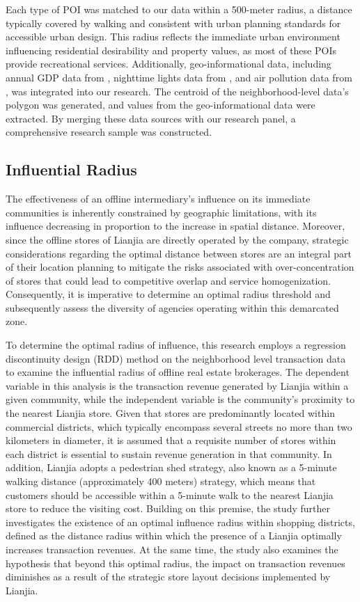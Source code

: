 \documentclass[11pt]{article}
\begin{document}
Each type of POI was matched to our data within a 500-meter radius, a distance typically covered by walking and consistent with urban planning standards for accessible urban design. This radius reflects the immediate urban environment influencing residential desirability and property values, as most of these POIs provide recreational services. Additionally, geo-informational data, including annual GDP data from \citet{zhao_forecasting_2017}, nighttime lights data from \citet{elvidge_annual_2021}, and air pollution data from \citet{doi:10.1021/acs.est.1c05309}, was integrated into our research. The centroid of the neighborhood-level data's polygon was generated, and values from the geo-informational data were extracted. By merging these data sources with our research panel, a comprehensive research sample was constructed.

\subsection{Influential Radius} \label{subsec:Influential_Radius}

The effectiveness of an offline intermediary's influence on its immediate communities is inherently constrained by geographic limitations, with its influence decreasing in proportion to the increase in spatial distance. Moreover, since the offline stores of Lianjia are directly operated by the company, strategic considerations regarding the optimal distance between stores are an integral part of their location planning to mitigate the risks associated with over-concentration of stores that could lead to competitive overlap and service homogenization. Consequently, it is imperative to determine an optimal radius threshold and subsequently assess the diversity of agencies operating within this demarcated zone.

To determine the optimal radius of influence, this research employs a regression discontinuity design (RDD) method on the neighborhood level transaction data to examine the influential radius of offline real estate brokerages. The dependent variable in this analysis is the transaction revenue generated by Lianjia within a given community, while the independent variable is the community's proximity to the nearest Lianjia store. Given that stores are predominantly located within commercial districts, which typically encompass several streets no more than two kilometers in diameter, it is assumed that a requisite number of stores within each district is essential to sustain revenue generation in that community. In addition, Lianjia adopts a pedestrian shed strategy, also known as a 5-minute walking distance (approximately 400 meters) strategy, which means that customers should be accessible within a 5-minute walk to the nearest Lianjia store to reduce the visiting cost. Building on this premise, the study further investigates the existence of an optimal influence radius within shopping districts, defined as the distance radius within which the presence of a Lianjia optimally increases transaction revenues. At the same time, the study also examines the hypothesis that beyond this optimal radius, the impact on transaction revenues diminishes as a result of the strategic store layout decisions implemented by Lianjia.
\end{document}
